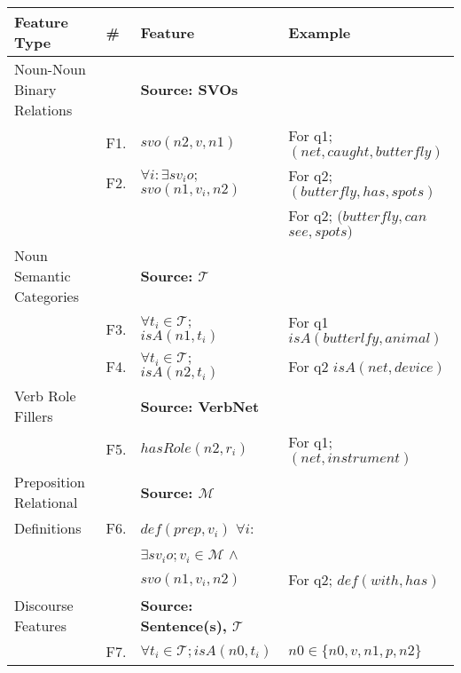 \begin{table*}[th]
%
\centering
%
\begin{tabular}{ |l| l|l|l| }
\hline
{\bf Feature Type} & {\bf \#} &  {\bf Feature}  & {\bf Example}\\
\hline

Noun-Noun Binary Relations &  & \textbf{Source: SVOs} & \\ 
   & F1. &  $svo(n2,v,n1)$  &  For q1; $(net,caught,butterfly)$\\ 
& F2. &  $\forall i : \exists sv_{i}o; $  $svo(n1,v_i,n2)$ & For q2; $(butterfly,has,spots)$ \\ 
& & & For q2; $(butterfly, can $ $see,spots)$\\ 

   Noun  Semantic Categories  &  &  {\bf Source: $\mathcal{T}$ }  & \\
                & F3. &  $\forall t_i \in \mathcal{T};$ $isA(n1,t_i)$ & For q1 $isA(butterlfy,animal)$\\ 
                   & F4. &  $\forall t_i \in \mathcal{T};$  $isA(n2,t_i)$ & For q2 $isA(net,device)$\\ 
                                                                                                          
  Verb  Role Fillers & & \textbf{Source: VerbNet} & \\ 
  & F5. &   $hasRole(n2, r_{i})$ &  For q1; $(net, instrument)$ \\

Preposition Relational  &  &  \textbf{Source: $\mathcal{M}$} & \\ 
  Definitions & F6. & $def(prep,v_i)$ $\forall i :$ &  
\\ 
         &  & $\exists sv_{i}o; v_i \in  \mathcal{M}$ $ \wedge$  &  
       \\ 
          &  &  $svo(n1,v_i,n2)$  &  For q2;
                    $def(with,has)$ \\ 
 
 Discourse Features &  & \textbf{Source: Sentence(s), $\mathcal{T}$} & \\ 
             & F7. &  $\forall t_i \in \mathcal{T}; isA(n0,t_i)$ &  $n0 \in \{n0, v, n1, p, n2\}$ \\


\end{tabular}
\end{table*}
